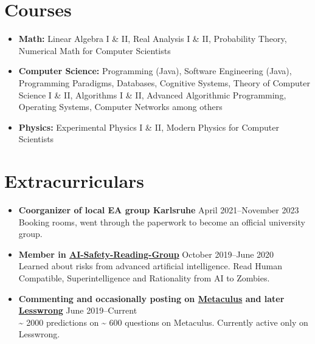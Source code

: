 \documentclass[letterpaper,10pt]{article}
\begin{document}
\section*{Courses}
\begin{itemize}
    \item \textbf{Math:} Linear Algebra I \& II, Real Analysis I \& II, Probability Theory, Numerical Math for Computer Scientists
    \item \textbf{Computer Science:} Programming (Java), Software Engineering (Java), Programming Paradigms, Databases, Cognitive Systems, Theory of Computer Science I \& II, Algorithms I \& II, Advanced Algorithmic Programming, Operating Systems, Computer Networks among others
    \item \textbf{Physics:} Experimental Physics I \& II, Modern Physics for Computer Scientists
\end{itemize}

\unless\ifdefined\EAVersion
\section*{Extracurriculars}
  \begin{itemize}
      \item {\textbf{Coorganizer of local EA group Karlsruhe}} \hfill April 2021--November 2023 \\
      {Booking rooms, went through the paperwork to become an official university group.}
      \item {\textbf{Member in \href{https://web.archive.org/web/20220123065219/http://aisafety.com/}{AI-Safety-Reading-Group}}} \hfill October 2019--June 2020 \\
      {Learned about risks from advanced artificial intelligence. Read Human Compatible, Superintelligence and Rationality from AI to Zombies.}
      \item {\textbf{Commenting and occasionally posting on \href{https://www.metaculus.com/accounts/profile/106992/}{Metaculus} and later \href{https://www.lesswrong.com/users/morpheus}{Lesswrong}}} \hfill June 2019--Current \\
      {\textasciitilde{} 2000 predictions on \textasciitilde{} 600 questions on Metaculus. Currently active only on Lesswrong.}
  \end{itemize}
\fi
\end{document}
